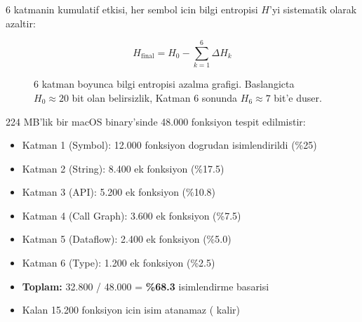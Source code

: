 6 katmanin kumulatif etkisi, her sembol icin bilgi entropisi $H$'yi
sistematik olarak azaltir:

\begin{equation}
  H_{\text{final}} = H_0 - \sum_{k=1}^{6} \Delta H_k
  \label{eq:total-entropy}
\end{equation}

\begin{figure}[htbp]
\centering
{}
\caption{6 katman boyunca bilgi entropisi azalma grafigi.
Baslangicta $H_0 \approx 20$ bit olan belirsizlik,
Katman 6 sonunda $H_6 \approx 7$ bit'e duser.}
\label{fig:entropy-reduction}
\end{figure}

\begin{example}
224 MB'lik bir macOS binary'sinde 48.000 fonksiyon tespit edilmistir:
\begin{itemize}
  \item Katman 1 (Symbol): 12.000 fonksiyon dogrudan isimlendirildi (\%25)
  \item Katman 2 (String): 8.400 ek fonksiyon (\%17.5)
  \item Katman 3 (API): 5.200 ek fonksiyon (\%10.8)
  \item Katman 4 (Call Graph): 3.600 ek fonksiyon (\%7.5)
  \item Katman 5 (Dataflow): 2.400 ek fonksiyon (\%5.0)
  \item Katman 6 (Type): 1.200 ek fonksiyon (\%2.5)
  \item \textbf{Toplam:} 32.800 / 48.000 = \textbf{\%68.3} isimlendirme basarisi
  \item Kalan 15.200 fonksiyon icin isim atanamaz ( kalir)
\end{itemize}
\end{example}


